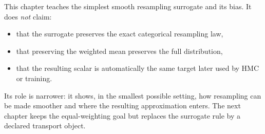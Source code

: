 This chapter teaches the simplest smooth resampling surrogate and its bias.  It
does \emph{not} claim:
\begin{itemize}
  \item that the surrogate preserves the exact categorical resampling law,
  \item that preserving the weighted mean preserves the full distribution,
  \item that the resulting scalar is automatically the same target later used by
  HMC or training.
\end{itemize}
Its role is narrower: it shows, in the smallest possible setting, how
resampling can be made smoother and where the resulting approximation enters.
The next chapter keeps the equal-weighting goal but replaces the surrogate rule
by a declared transport object.

\FloatBarrier
